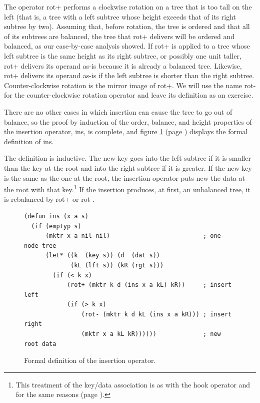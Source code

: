 The operator \textsf{rot}+ performs a clockwise
rotation on a tree that is too tall on the left
(that is, a tree with a left subtree whose height exceeds that
of its right subtree by two).
Assuming that, before rotation,
the tree is ordered and that all of its subtrees are balanced,
the tree that \textsf{rot}+ delivers will be ordered and balanced,
as our case-by-case analysis showed.
If \textsf{rot}+ is applied to a tree whose left subtree
is the same height as its right subtree,
or possibly one unit taller, \textsf{rot}+ delivers its operand as-is
because it is already a balanced tree.
Likewise, \textsf{rot}+ delivers its operand as-is
if the left subtree is shorter than the right subtree.
Counter-clockwise rotation is the mirror image of \textsf{rot}+.
We will use the name \textsf{rot-} for the counter-clockwise rotation operator
and leave its definition as an exercise.

There are no other cases in which insertion
can cause the tree to go out of balance,
so the proof by induction of the
order, balance, and height properties
of the insertion operator, \textsf{ins}, is complete, and
figure \ref{defun:ins} (page \pageref{defun:ins})
displays the formal definition of \textsf{ins}.

The definition is inductive.
The new key goes into the left subtree
if it is smaller than the key at the root
and into the right subtree if it is greater.
If the new key is the same as the one at the root,
the insertion operator puts new the data at the root
with that key.\footnote{This treatment
of the key/data association is
as with the \textsf{hook} operator and for the same reasons
(page \pageref{same-key-new-data}).}
If the insertion produces, at first, an unbalanced tree,
it is rebalanced by \textsf{rot}+ or \textsf{rot-}.

\begin{figure}
\begin{center}
\begin{code}
\begin{verbatim}
(defun ins (x a s)
  (if (emptyp s)
      (mktr x a nil nil)                          ; one-node tree
      (let* ((k  (key s)) (d  (dat s))
             (kL (lft s)) (kR (rgt s)))
        (if (< k x)
            (rot+ (mktr k d (ins x a kL) kR))     ; insert left
            (if (> k x)
                (rot- (mktr k d kL (ins x a kR))) ; insert right
                (mktr x a kL kR))))))             ; new root data
\end{verbatim}
\end{code}
\end{center}
\caption{Formal definition of the insertion operator.}
\label{defun:ins}
\end{figure}

